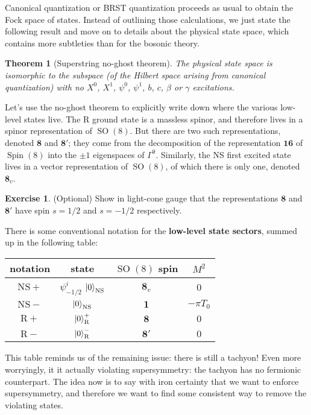 \documentclass{report}
\theoremstyle{plain}
\newtheorem{theorem}{Theorem}[section]
\theoremstyle{definition}
\newtheorem{exercise}{Exercise}[section]
\theoremstyle{remark}
\DeclareMathOperator{\SO}{SO}
\DeclareMathOperator{\Spin}{Spin}
\newcommand{\rep}[1]{\mathbf{#1}}
\newcommand{\NS}{\mathrm{NS}}
\newcommand{\R}{\mathrm{R}}
\begin{document}
Canonical quantization or BRST quantization proceeds as usual to
obtain the Fock space of states. Instead of outlining those
calculations, we just state the following result and move on to
details about the physical state space, which contains more subtleties
than for the bosonic theory.

\begin{theorem}[Superstring no-ghost theorem]
  The physical state space is isomorphic to the subspace (of the
  Hilbert space arising from canonical quantization) with no $X^0$,
  $X^1$, $\psi^0$, $\psi^1$, $b$, $c$, $\beta$ or $\gamma$
  excitations.
\end{theorem}

Let's use the no-ghost theorem to explicitly write down where the
various low-level states live. The R ground state is a massless
spinor, and therefore lives in a spinor representation of $\SO(8)$.
But there are two such representations, denoted $\rep{8}$ and
$\rep{8}'$; they come from the decomposition of the representation
$\rep{16}$ of $\Spin(8)$ into the $\pm 1$ eigenspaces of $\Gamma^9$.
Similarly, the NS first excited state lives in a vector representation
of $\SO(8)$, of which there is only one, denoted $\rep{8}_v$.

\begin{exercise} (Optional)
  Show in light-cone gauge that the representations $\rep{8}$ and
  $\rep{8}'$ have spin $s = 1/2$ and $s = -1/2$ respectively.
\end{exercise}

There is some conventional notation for the {\bf low-level state
  sectors}, summed up in the following table:
\begin{center}
\begin{tabular}{cccc}
  notation & state & $\SO(8)$ spin & $M^2$ \\ \hline
  $\NS+$ & $\psi^i_{-1/2}$ $\ket{0}_{\NS}$ & $\rep{8}_v$ & $0$ \\
  $\NS-$ & $\ket{0}_{\NS}$ & $\rep{1}$ & $-\pi T_0$ \\
  $\R+$ & $\ket{0}_{\R}^+$ & $\rep{8}$ & $0$ \\
  $\R-$ & $\ket{0}_{\R}^-$ & $\rep{8}'$ & $0$
\end{tabular}
\end{center}
This table reminds us of the remaining issue: there is still a
tachyon! Even more worryingly, it it actually violating supersymmetry:
the tachyon has no fermionic counterpart. The idea now is to say with
iron certainty that we want to enforce supersymmetry, and therefore we
want to find some consistent way to remove the violating states.
\end{document}

